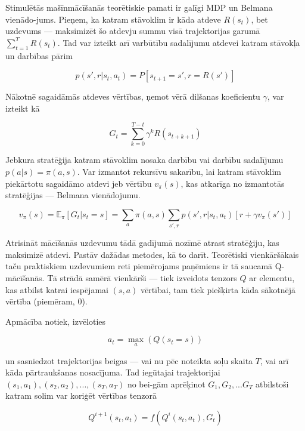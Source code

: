 \documentclass[12pt, a4paper]{article}
\numberwithin{equation}{section} %
\begin{document}
Stimulētās mašīnmācīšanās teorētiskie pamati ir galīgi MDP un Belmana vienādo-jums\cite{sutton2018reinforcement}. Pieņem, ka katram stāvoklim ir kāda atdeve $R(s_t)$, bet uzdevums --- maksimizēt šo atdevju summu visā trajektorijas garumā $\sum_{t=1}^T R(s_t)$. Tad var izteikt arī varbūtību sadalījumu atdevei katram stāvokļa un darbības pārim

\begin{equation}
    p(s', r \vert s_t, a_t) = P[s_{t+1}=s', r=R(s')]
\end{equation}

Nākotnē sagaidāmās atdeves vērtības, ņemot vērā dilšanas koeficientu $\gamma$,  var izteikt kā

\begin{equation}
    G_t = \sum_{k=0}^{T-t} \gamma^k R(s_{t+k+1})
\end{equation}

Jebkura stratēģija katram stāvoklim nosaka darbību vai darbību sadalījumu $p(a \vert s) = \pi(a,s)$. Var izmantot rekursīvu sakarību, lai katram stāvoklim piekārtotu sagaidāmo atdevi jeb vērtību $v_{\pi}(s)$, kas atkarīga no izmantotās stratēģijas --- Belmana vienādojumu.

\begin{equation}
    v_{\pi}(s) = \mathbb{E}_{\pi}[G_t \vert s_t = s] = \sum_{a}\pi(a,s)\sum_{s', r}p(s', r \vert s_t, a_t)[r + \gamma v_{\pi}(s')]
\end{equation}

Atrisināt mācīšanās uzdevumu tādā gadījumā nozīmē atrast stratēģiju, kas maksimizē atdevi. Pastāv dažādas metodes, kā to darīt. Teorētiski vienkāršākais taču praktiskiem uzdevumiem reti piemērojams paņēmiens ir tā saucamā Q-mācīšanās. Tā strādā samērā vienkārši --- tiek izveidots tenzors $Q$ ar elementu, kas atbilst katrai iespējamai $(s,a)$ vērtībai, tam tiek piešķirta kāda sākotnējā vērtība (piemēram, 0). 

Apmācība notiek, izvēloties

\begin{equation}
    a_t = \max\limits_{a} (Q(s_t = s))
\end{equation}

un sasniedzot trajektorijas beigas --- vai nu pēc noteikta soļu skaita $T$, vai arī kāda pārtraukšanas nosacījuma. Tad iegūtajai trajektorijai $(s_1, a_1), (s_2, a_2), ..., (s_T, a_T)$ no bei-gām aprēķinot $G_1, G_2, ... G_T$ atbilstoši katram solim var koriģēt vērtības tenzorā

\begin{equation}
    Q^{i+1}(s_t,a_t)=f(Q^{i}(s_t, a_t), G_t)
\end{equation}
\end{document}
